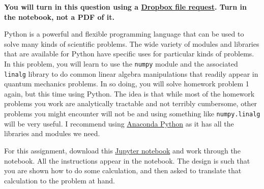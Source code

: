 \documentclass[
]{article}
\begin{document}
\textbf{You will turn in this question using a
\href{https://www.dropbox.com/request/u3J2phx9zlkCZXfpzJaR}{Dropbox file
request}. Turn in the notebook, not a PDF of it.}

Python is a powerful and flexible programming language that can be used
to solve many kinds of scientific problems. The wide variety of modules
and libraries that are available for Python have specific uses for
particular kinds of problems. In this problem, you will learn to use the
\texttt{numpy} module and the associated \texttt{linalg} library to do
common linear algebra manipulations that readily appear in quantum
mechanics problems. In so doing, you will solve homework problem 1
again, but this time using Python. The idea is that while most of the
homework problems you work are analytically tractable and not terribly
cumbersome, other problems you might encounter will not be and using
something like \texttt{numpy.linalg} will be very useful. I recommend
using \href{https://www.anaconda.com/products/individual}{Anaconda
Python} as it has all the libraries and modules we need.

For this assignment, download this
\href{./notebooks/Homework1_Problem5_STUDENT.ipynb}{Jupyter notebook}
and work through the notebook. All the instructions appear in the
notebook. The design is such that you are shown how to do some
calculation, and then asked to translate that calculation to the problem
at hand.
\end{document}
